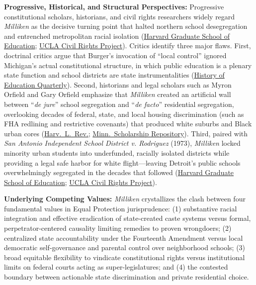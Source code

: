 \documentclass[12pt]{article}
\begin{document}
\textbf{Progressive, Historical, and Structural Perspectives:} Progressive constitutional scholars, historians, and civil rights researchers widely regard \textit{Milliken} as the decisive turning point that halted northern school desegregation and entrenched metropolitan racial isolation (\href{https://www.gse.harvard.edu/ideas/ed-magazine/14/06/brown-60-and-milliken-40}{Harvard Graduate School of Education}; \href{https://civilrightsproject.ucla.edu/wp-content/uploads/2024/04/National-Segregation-041624-CORRECTED-for-1.pdf}{UCLA Civil Rights Project}). Critics identify three major flaws. First, doctrinal critics argue that Burger's invocation of ``local control'' ignored Michigan's actual constitutional structure, in which public education is a plenary state function and school districts are state instrumentalities (\href{https://www.cambridge.org/core/journals/history-of-education-quarterly/article/revisiting-milliken-v-bradley-michigan-v-the-city-of-detroit/01AD852371763098FB095AD0F45CA8A5}{History of Education Quarterly}). Second, historians and legal scholars such as Myron Orfield and Gary Orfield emphasize that \textit{Milliken} created an artificial wall between ``\textit{de jure}'' school segregation and ``\textit{de facto}'' residential segregation, overlooking decades of federal, state, and local housing discrimination (such as FHA redlining and restrictive covenants) that produced white suburbs and Black urban cores (\href{https://harvardlawreview.org/wp-content/uploads/2026/03/139-Harv.-L.-Rev.-1089.pdf}{Harv.\ L.\ Rev.}; \href{https://scholarship.law.umn.edu/cgi/viewcontent.cgi?article=1987&context=faculty_articles}{Minn.\ Scholarship Repository}). Third, paired with \textit{San Antonio Independent School District v. Rodriguez} (1973), \textit{Milliken} locked minority urban students into underfunded, racially isolated districts while providing a legal safe harbor for white flight---leaving Detroit's public schools overwhelmingly segregated in the decades that followed (\href{https://www.gse.harvard.edu/ideas/ed-magazine/14/06/brown-60-and-milliken-40}{Harvard Graduate School of Education}; \href{https://civilrightsproject.ucla.edu/wp-content/uploads/2024/04/National-Segregation-041624-CORRECTED-for-1.pdf}{UCLA Civil Rights Project}).

\textbf{Underlying Competing Values:} \textit{Milliken} crystallizes the clash between four fundamental values in Equal Protection jurisprudence: (1) substantive racial integration and effective eradication of state-created caste systems versus formal, perpetrator-centered causality limiting remedies to proven wrongdoers; (2) centralized state accountability under the Fourteenth Amendment versus local democratic self-governance and parental control over neighborhood schools; (3) broad equitable flexibility to vindicate constitutional rights versus institutional limits on federal courts acting as super-legislatures; and (4) the contested boundary between actionable state discrimination and private residential choice.
\end{document}
